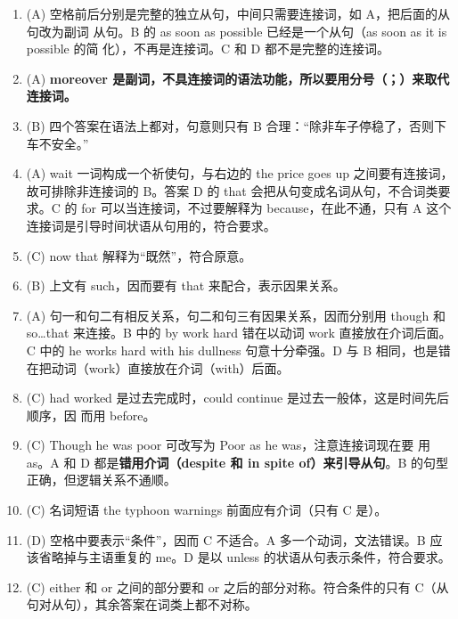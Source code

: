 \begin{enumerate}

\item (A) 空格前后分别是完整的独立从句，中间只需要连接词，如 A，把后面的从句改为副词
  从句。B 的 as soon as possible 已经是一个从句（as soon as it is possible 的简
  化），不再是连接词。C 和 D 都不是完整的连接词。

\item (A) \textbf{moreover 是副词，不具连接词的语法功能，所以要用分号（；）来取代连接词。}

\item (B) 四个答案在语法上都对，句意则只有 B 合理：“除非车子停稳了，否则下车不安全。”

\item (A) wait 一词构成一个祈使句，与右边的 the price goes up 之间要有连接词，故可排除非连接词的 B。答案 D 的 that 会把从句变成名词从句，不合词类要求。C 的 for 可以当连接词，不过要解释为 because，在此不通，只有 A 这个连接词是引导时间状语从句用的，符合要求。

\item (C) now that 解释为“既然”，符合原意。

\item (B) 上文有 such，因而要有 that 来配合，表示因果关系。

\item (A) 句一和句二有相反关系，句二和句三有因果关系，因而分别用 though 和 so…that 来连接。B 中的 by work hard 错在以动词 work 直接放在介词后面。C 中的 he works hard with his dullness 句意十分牵强。D 与 B 相同，也是错在把动词（work）直接放在介词（with）后面。

\item (C) had worked 是过去完成时，could continue 是过去一般体，这是时间先后顺序，因
  而用 before。

\item (C) Though he was poor 可改写为 Poor as he was，注意连接词现在要
  用 as。A 和 D 都是\textbf{错用介词（despite 和 in spite of）来引导从句}。B
  的句型正确，但逻辑关系不通顺。

\item (C) 名词短语 the typhoon warnings 前面应有介词（只有 C 是）。

\item  (D) 空格中要表示“条件”，因而 C 不适合。A 多一个动词，文法错误。B 应该省略掉与主语重复的 me。D 是以 unless 的状语从句表示条件，符合要求。

\item  (C) either 和 or 之间的部分要和 or 之后的部分对称。符合条件的只有 C（从句对从句），其余答案在词类上都不对称。


\end{enumerate}
